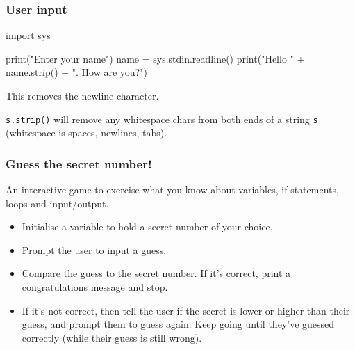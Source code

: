 \documentclass{beamer}
\begin{document}
\begin{frame}[fragile]
\frametitle{User input}
\begin{code}
import sys

print("Enter your name")
name = sys.stdin.readline()
print("Hello " + name.strip() + ". How are you?")
\end{code}
This removes the newline character.

\texttt{s.strip()} will remove any whitespace chars from both ends of a
string \texttt{s} (whitespace is spaces, newlines, tabs).
\end{frame}


\begin{frame}
\frametitle{Guess the secret number!}
An interactive game to exercise what you know about
variables, if statements, loops and input/output.
\begin{itemize}
\item Initialise a variable to hold a secret number of your
choice.
\item Prompt the user to input a guess.
\item Compare the guess to the secret number. If it's
correct, print a congratulations message and stop.
\item If it's not correct, then tell the user if the secret is
lower or higher than their guess, and prompt them to
guess again. Keep going until they've guessed
correctly (while their guess is still wrong).
\end{itemize}
\end{frame}
\end{document}
